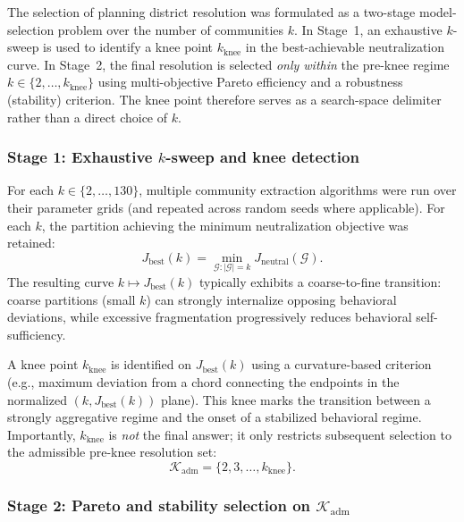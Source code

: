 \documentclass[conference]{IEEEtran}
\begin{document}
The selection of planning district resolution was formulated as a two-stage
model-selection problem over the number of communities $k$.
In Stage~1, an exhaustive $k$-sweep is used to identify a knee point
$k_{\mathrm{knee}}$ in the best-achievable neutralization curve. In Stage~2,
the final resolution is selected \emph{only within} the pre-knee regime
$k \in \{2,\dots,k_{\mathrm{knee}}\}$ using multi-objective Pareto efficiency
and a robustness (stability) criterion. The knee point therefore serves as a
search-space delimiter rather than a direct choice of $k$.

\subsubsection*{Stage 1: Exhaustive $k$-sweep and knee detection}

For each $k \in \{2,\dots,130\}$, multiple community extraction algorithms were
run over their parameter grids (and repeated across random seeds where
applicable). For each $k$, the partition achieving the minimum neutralization
objective was retained:
\begin{equation}
J_{\mathrm{best}}(k)=\min_{\mathcal{G}:|\mathcal{G}|=k} J_{\mathrm{neutral}}(\mathcal{G}).
\end{equation}
The resulting curve $k \mapsto J_{\mathrm{best}}(k)$ typically exhibits a
coarse-to-fine transition: coarse partitions (small $k$) can strongly internalize
opposing behavioral deviations, while excessive fragmentation progressively
reduces behavioral self-sufficiency.

A knee point $k_{\mathrm{knee}}$ is identified on $J_{\mathrm{best}}(k)$ using a
curvature-based criterion (e.g., maximum deviation from a chord connecting the
endpoints in the normalized $(k, J_{\mathrm{best}}(k))$ plane). This knee marks
the transition between a strongly aggregative regime and the onset of a
stabilized behavioral regime. Importantly, $k_{\mathrm{knee}}$ is \emph{not} the
final answer; it only restricts subsequent selection to the admissible
pre-knee resolution set:
\begin{equation}
\mathcal{K}_{\mathrm{adm}}=\{2,3,\dots,k_{\mathrm{knee}}\}.
\end{equation}

\subsubsection*{Stage 2: Pareto and stability selection on $\mathcal{K}_{\mathrm{adm}}$}
\end{document}

